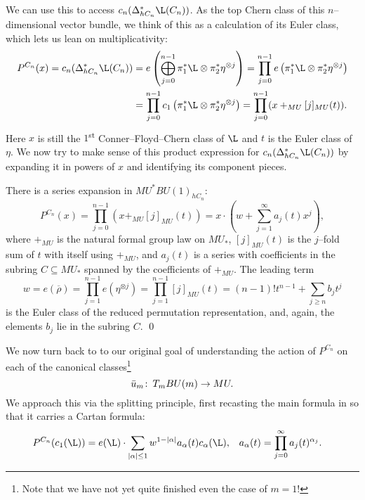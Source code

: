 We can use this to access \(c_n(\Delta_{hC_n}^* \L(C_n))\).  As the top Chern class of this \(n\)--dimensional vector bundle, we think of this as a calculation of its Euler class, which lets us lean on multiplicativity:
\begin{align*}
P^{C_n}(x) = c_n(\Delta_{hC_n}^* \L(C_n)) & = e\left( \bigoplus_{j=0}^{n-1} \pi_1^* \L \otimes \pi_2^* \eta^{\otimes j} \right)
= \prod_{j=0}^{n-1} e\left( \pi_1^* \L \otimes \pi_2^* \eta^{\otimes j} \right) \\
& = \prod_{j=0}^{n-1} c_1\left( \pi_1^* \L \otimes \pi_2^* \eta^{\otimes j} \right)
= \prod_{j=0}^{n-1} (x +_{MU} [j]_{MU}(t)).
\end{align*}
Here \(x\) is still the \(1\)\textsuperscript{st} Conner--Floyd--Chern class of \(\L\) and \(t\) is the Euler class of \(\eta\).  We now try to make sense of this product expression for \(c_n(\Delta_{hC_n}^* \L(C_n))\) by expanding it in powers of \(x\) and identifying its component pieces.
\begin{lemma}\label{AjAndBjAreInTheFGLSubring}
There is a series expansion in \(MU^* BU(1)_{hC_n}\): \[P^{C_n}(x) = \prod_{j=0}^{n-1} (x +_{MU} [j]_{MU}(t)) = x \cdot \left( w + \sum_{j=1}^\infty a_j(t) x^j \right),\] where \(+_{MU}\) is the natural formal group law on \(MU_*\), \([j]_{MU}(t)\) is the \(j\)--fold sum of \(t\) with itself using \(+_{MU}\), and \(a_j(t)\) is a series with coefficients in the subring \(C \subseteq MU_*\) spanned by the coefficients of \(+_{MU}\).  The leading term \[w = e(\overline \rho) = \prod_{j=1}^{n-1} e(\eta^{\otimes j}) = \prod_{j=1}^{n-1} [j]_{MU} (t) = (n-1)! t^{n-1} + \sum_{j \ge n} b_j t^j\] is the Euler class of the reduced permutation representation, and, again, the elements \(b_j\) lie in the subring \(C\). \qed
\end{lemma}

We now turn back to to our original goal of understanding the action of \(P^{C_n}\) on each of the canonical classes\footnote{Note that we have not yet quite finished even the case of $m = 1$!} \[\bar u_m\colon\thinspace T_m BU(m) \to MU.\]  We approach this via the splitting principle, first recasting the main formula in  so that it carries a Cartan formula:
\begin{align*}
P^{C_n}(c_1(\L)) & = e(\L) \cdot \sum_{|\alpha| \le 1} w^{1 - |\alpha|} a_\alpha(t) c_\alpha(\L), &
a_\alpha(t) & = \prod_{j=0}^\infty a_j(t)^{\alpha_j}.
\end{align*}


